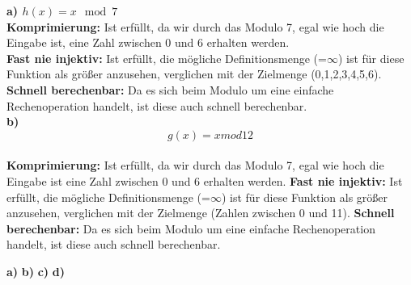 \documentclass[german]{../uebung}
\begin{document}
\begin{exercise}{1}
	\textbf{a) \(h(x) = x \mod 7\)}\\
	\textbf{Komprimierung:}
	Ist erfüllt, da wir durch das Modulo 7, egal wie hoch die Eingabe ist, eine Zahl zwischen 0 und 6 erhalten werden.\\
	\textbf{Fast nie injektiv:}
	Ist erfüllt, die mögliche Definitionsmenge (=\(\infty\)) ist für diese Funktion als größer anzusehen, verglichen mit der Zielmenge (0,1,2,3,4,5,6).\\
	\textbf{Schnell berechenbar:}
	Da es sich beim Modulo um eine einfache Rechenoperation handelt, ist diese auch schnell berechenbar.\\
	\textbf{b) \[g(x) = x mod 12\]}\\
	\textbf{Komprimierung:}
	Ist erfüllt, da wir durch das Modulo 7, egal wie hoch die Eingabe ist eine Zahl zwischen 0 und 6 erhalten werden.
	\textbf{Fast nie injektiv:}
	Ist erfüllt, die mögliche Definitionsmenge (=\(\infty\)) ist für diese Funktion als größer anzusehen, verglichen mit der Zielmenge (Zahlen zwischen 0 und 11).
	\textbf{Schnell berechenbar:}
	Da es sich beim Modulo um eine einfache Rechenoperation handelt, ist diese auch schnell berechenbar.
\end{exercise}

\begin{exercise}{2}
\end{exercise}

\begin{exercise}{3}

\end{exercise}
\begin{exercise}{4}
	\textbf{a)}
	\textbf{b)}
	\textbf{c)}
	\textbf{d)}
\end{exercise}
\begin{exercise}{5}

\end{exercise}
\end{document}
